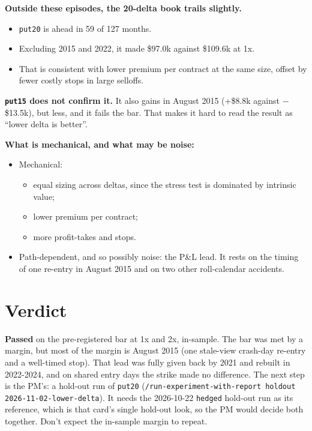 \documentclass{article}
\begin{document}
\textbf{Outside these episodes, the 20-delta book trails slightly.}

\begin{itemize}

\item \texttt{put20} is ahead in 59 of 127 months.

\item Excluding 2015 and 2022, it made \$97.0k against \$109.6k at 1x.

\item That is consistent with lower premium per contract at the same size, offset by fewer costly stops in large selloffs.

\end{itemize}

\textbf{\texttt{put15} does not confirm it.} It also gains in August 2015 (+\$8.8k against \ensuremath{-}\$13.5k), but less, and it fails the bar. That makes it hard to read the result as ``lower delta is better''.

\textbf{What is mechanical, and what may be noise:}

\begin{itemize}

\item Mechanical:

\begin{itemize}

\item equal sizing across deltas, since the stress test is dominated by intrinsic value;

\item lower premium per contract;

\item more profit-takes and stops.

\end{itemize}

\item Path-dependent, and so possibly noise: the P\&L lead. It rests on the timing of one re-entry in August 2015 and on two other roll-calendar accidents.

\end{itemize}

\section{Verdict}

\textbf{Passed} on the pre-registered bar at 1x and 2x, in-sample. The bar was met by a margin, but most of the margin is August 2015 (one stale-view crash-day re-entry and a well-timed stop). That lead was fully given back by 2021 and rebuilt in 2022-2024, and on shared entry days the strike made no difference. The next step is the PM's: a hold-out run of \texttt{put20} (\texttt{/\allowbreak{}run-\allowbreak{}experiment-\allowbreak{}with-\allowbreak{}report holdout 2026-\allowbreak{}11-\allowbreak{}02-\allowbreak{}lower-\allowbreak{}delta}). It needs the 2026-10-22 \texttt{hedged} hold-out run as its reference, which is that card's single hold-out look, so the PM would decide both together. Don't expect the in-sample margin to repeat.
\end{document}
